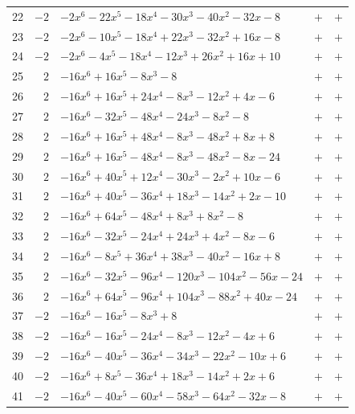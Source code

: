 \documentclass[11pt]{article}
\begin{document}
\begin{longtable}{@{}rrlcc@{}}
22 & $-2$ & $-2x^{6}-22x^{5}-18x^{4}-30x^{3}-40x^{2}-32x-8$ & $+$ & $+$\\
23 & $-2$ & $-2x^{6}-10x^{5}-18x^{4}+22x^{3}-32x^{2}+16x-8$ & $+$ & $+$\\
24 & $-2$ & $-2x^{6}-4x^{5}-18x^{4}-12x^{3}+26x^{2}+16x+10$ & $+$ & $+$\\
25 & $2$ & $-16x^{6}+16x^{5}-8x^{3}-8$ & $+$ & $+$\\
26 & $2$ & $-16x^{6}+16x^{5}+24x^{4}-8x^{3}-12x^{2}+4x-6$ & $+$ & $+$\\
27 & $2$ & $-16x^{6}-32x^{5}-48x^{4}-24x^{3}-8x^{2}-8$ & $+$ & $+$\\
28 & $2$ & $-16x^{6}+16x^{5}+48x^{4}-8x^{3}-48x^{2}+8x+8$ & $+$ & $+$\\
29 & $2$ & $-16x^{6}+16x^{5}-48x^{4}-8x^{3}-48x^{2}-8x-24$ & $+$ & $+$\\
30 & $2$ & $-16x^{6}+40x^{5}+12x^{4}-30x^{3}-2x^{2}+10x-6$ & $+$ & $+$\\
31 & $2$ & $-16x^{6}+40x^{5}-36x^{4}+18x^{3}-14x^{2}+2x-10$ & $+$ & $+$\\
32 & $2$ & $-16x^{6}+64x^{5}-48x^{4}+8x^{3}+8x^{2}-8$ & $+$ & $+$\\
33 & $2$ & $-16x^{6}-32x^{5}-24x^{4}+24x^{3}+4x^{2}-8x-6$ & $+$ & $+$\\
34 & $2$ & $-16x^{6}-8x^{5}+36x^{4}+38x^{3}-40x^{2}-16x+8$ & $+$ & $+$\\
35 & $2$ & $-16x^{6}-32x^{5}-96x^{4}-120x^{3}-104x^{2}-56x-24$ & $+$ & $+$\\
36 & $2$ & $-16x^{6}+64x^{5}-96x^{4}+104x^{3}-88x^{2}+40x-24$ & $+$ & $+$\\
37 & $-2$ & $-16x^{6}-16x^{5}-8x^{3}+8$ & $+$ & $+$\\
38 & $-2$ & $-16x^{6}-16x^{5}-24x^{4}-8x^{3}-12x^{2}-4x+6$ & $+$ & $+$\\
39 & $-2$ & $-16x^{6}-40x^{5}-36x^{4}-34x^{3}-22x^{2}-10x+6$ & $+$ & $+$\\
40 & $-2$ & $-16x^{6}+8x^{5}-36x^{4}+18x^{3}-14x^{2}+2x+6$ & $+$ & $+$\\
41 & $-2$ & $-16x^{6}-40x^{5}-60x^{4}-58x^{3}-64x^{2}-32x-8$ & $+$ & $+$\\
\end{longtable}
\endgroup
\end{document}
